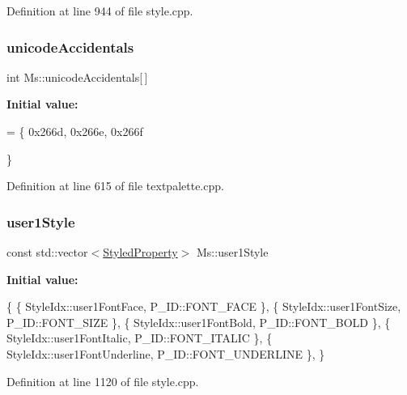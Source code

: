Definition at line 944 of file style.\+cpp.

\mbox{\label{namespace_ms_ab2a2f86304b1c4b8c7a5ab83649e4de5}} 
\subsubsection{\texorpdfstring{unicode\+Accidentals}{unicodeAccidentals}}
{\footnotesize\ttfamily int Ms\+::unicode\+Accidentals\mbox{[}$\,$\mbox{]}}

{\bfseries Initial value\+:}
\begin{DoxyCode}
= \{ 
      0x266d,    
      0x266e,    
      0x266f     
      
      
      
      \}
\end{DoxyCode}


Definition at line 615 of file textpalette.\+cpp.

\mbox{\label{namespace_ms_ade6be0f9e73f2c1fa69721c5d3e5bb61}} 
\subsubsection{\texorpdfstring{user1\+Style}{user1Style}}
{\footnotesize\ttfamily const std\+::vector$<$\hyperlink{struct_ms_1_1_styled_property}{Styled\+Property}$>$ Ms\+::user1\+Style}

{\bfseries Initial value\+:}
\begin{DoxyCode}
\{
      \{ StyleIdx::user1FontFace,                      P\_ID::FONT\_FACE              \},
      \{ StyleIdx::user1FontSize,                      P\_ID::FONT\_SIZE              \},
      \{ StyleIdx::user1FontBold,                      P\_ID::FONT\_BOLD              \},
      \{ StyleIdx::user1FontItalic,                    P\_ID::FONT\_ITALIC            \},
      \{ StyleIdx::user1FontUnderline,                 P\_ID::FONT\_UNDERLINE         \},
      \}
\end{DoxyCode}


Definition at line 1120 of file style.\+cpp.

\mbox{\label{namespace_ms_a356e85104e3a6fa0a343a3db89c3b166}} 
